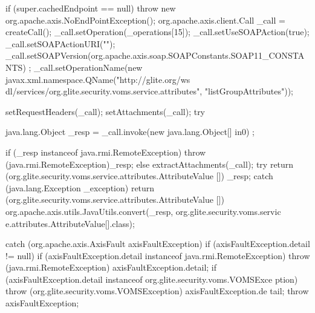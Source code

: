 \begin{DoxyCode}
                                                                                 
                                                                                       
                            {
        if (super.cachedEndpoint == null) {
            throw new org.apache.axis.NoEndPointException();
        }
        org.apache.axis.client.Call _call = createCall();
        _call.setOperation(_operations[15]);
        _call.setUseSOAPAction(true);
        _call.setSOAPActionURI("");
        _call.setSOAPVersion(org.apache.axis.soap.SOAPConstants.SOAP11_CONSTANTS)
      ;
        _call.setOperationName(new javax.xml.namespace.QName("http://glite.org/ws
      dl/services/org.glite.security.voms.service.attributes", "listGroupAttributes"));
      

        setRequestHeaders(_call);
        setAttachments(_call);
 try {        java.lang.Object _resp = _call.invoke(new java.lang.Object[] {in0})
      ;

        if (_resp instanceof java.rmi.RemoteException) {
            throw (java.rmi.RemoteException)_resp;
        }
        else {
            extractAttachments(_call);
            try {
                return (org.glite.security.voms.service.attributes.AttributeValue
      []) _resp;
            } catch (java.lang.Exception _exception) {
                return (org.glite.security.voms.service.attributes.AttributeValue
      []) org.apache.axis.utils.JavaUtils.convert(_resp, org.glite.security.voms.servic
      e.attributes.AttributeValue[].class);
            }
        }
  } catch (org.apache.axis.AxisFault axisFaultException) {
    if (axisFaultException.detail != null) {
        if (axisFaultException.detail instanceof java.rmi.RemoteException) {
              throw (java.rmi.RemoteException) axisFaultException.detail;
         }
        if (axisFaultException.detail instanceof org.glite.security.voms.VOMSExce
      ption) {
              throw (org.glite.security.voms.VOMSException) axisFaultException.de
      tail;
         }
   }
  throw axisFaultException;
}
    }
\end{DoxyCode}
